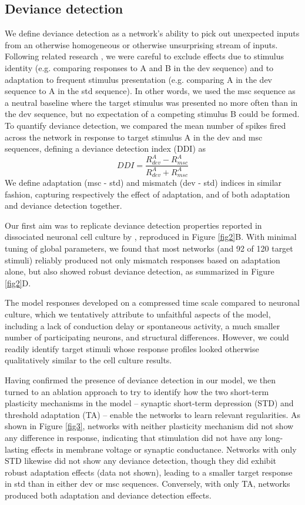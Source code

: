 \documentclass[pdflatex,iicol,sn-basic]{sn-jnl}
\theoremstyle{thmstyleone}%
\theoremstyle{thmstyletwo}%
\theoremstyle{thmstylethree}%
\begin{document}
\subsection{Deviance detection}\label{sec-dd}

We define deviance detection as a network's ability to pick out unexpected inputs from an otherwise homogeneous or otherwise unsurprising stream of inputs. Following related research \citep{TODO}, we were careful to exclude effects due to stimulus identity (e.g. comparing responses to A and B in the dev sequence) and to adaptation to frequent stimulus presentation (e.g. comparing A in the dev sequence to A in the std sequence). In other words, we used the msc sequence as a neutral baseline where the target stimulus was presented no more often than in the dev sequence, but no expectation of a competing stimulus B could be formed. To quantify deviance detection, we compared the mean number of spikes fired across the network in response to target stimulus A in the dev and msc sequences, defining a deviance detection index (DDI) as
\begin{equation}
    DDI = \frac{R^A_{dev} - R^A_{msc}}{R^A_{dev} + R^A_{msc}}
\end{equation}
We define adaptation (msc - std) and mismatch (dev - std) indices in similar fashion, capturing respectively the effect of adaptation, and of both adaptation and deviance detection together.

Our first aim was to replicate deviance detection properties reported in dissociated neuronal cell culture by \cite{Kubota2021-dx}, reproduced in Figure \ref{fig2}B. With minimal tuning of global parameters, we found that most networks (and 92 of 120 target stimuli) reliably produced not only mismatch responses based on adaptation alone, but also showed robust deviance detection, as summarized in Figure \ref{fig2}D.

The model responses developed on a compressed time scale compared to neuronal culture, which we tentatively attribute to unfaithful aspects of the model, including a lack of conduction delay or spontaneous activity, a much smaller number of participating neurons, and structural differences. However, we could readily identify target stimuli whose response profiles looked otherwise qualitatively similar to the cell culture results.

Having confirmed the presence of deviance detection in our model, we then turned to an ablation approach to try to identify how the two short-term plasticity mechanisms in the model -- synaptic short-term depression (STD) and threshold adaptation (TA) -- enable the networks to learn relevant regularities. As shown in Figure \ref{fig3}, networks with neither plasticity mechanism did not show any difference in response, indicating that stimulation did not have any long-lasting effects in membrane voltage or synaptic conductance. Networks with only STD likewise did not show any deviance detection, though they did exhibit robust adaptation effects (data not shown), leading to a smaller target response in std than in either dev or msc sequences. Conversely, with only TA, networks produced both adaptation and deviance detection effects.
\end{document}
